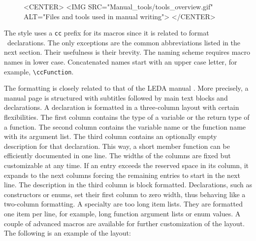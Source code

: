 \documentclass[11pt]{article}
\makeatletter
\newcommand{\TTindex}[1]{\index{#1@{\tt #1}}}
\newcommand{\Dindex}[1]{#1\index{#1}}
\makeatother
\begin{document}
\def\figuretopindent{\vspace{2ex}}

\begin{figure}
    \label{ToolsOverviewFig}\figuretopindent
\begin{ccHtmlOnly}
<CENTER>
  <IMG SRC="Manual_tools/tools_overview.gif" ALT="Files and tools used in manual writing">
</CENTER>
\end{ccHtmlOnly}
\end{figure}

 The style uses a {\tt cc} prefix for its macros since it is related to format \CC\
declarations. The only exceptions are the common abbreviations listed
in the next section. Their usefulness is their brevity. The naming
scheme requires macro names in lower case.  Concatenated names start
with an upper case letter, for example, \verb+\ccFunction+.

 The formatting is closely related to that of the
LEDA\TTindex{LEDA} manual \cite{Naeher95}.  More precisely, a manual
page is structured with subtitles followed by main text blocks and
declarations. A declaration is formatted in a \Dindex{three-column
  layout} with certain flexibilities.  The first column contains the
type of a variable or the return type of a function. The second column
contains the variable name or the function name with its argument
list. The third column contains an optionally empty description for
that declaration. This way, a short member function can be efficiently
documented in one line. The widths of the columns are fixed but
customizable at any time. If an entry exceeds the reserved space in
its column, it expands to the next columns forcing the remaining
entries to start in the next line. The description in the third column
is block formatted.  Declarations, such as constructors or enums, set
their first column to zero width, thus behaving like a two-column
formatting.  A specialty are too long \Dindex{item lists}.  They are
formatted one item per line, for example, long function argument lists
or enum values. A couple of advanced macros are available for further
customization of the layout. The following is an example of the
layout: 
\end{document}
